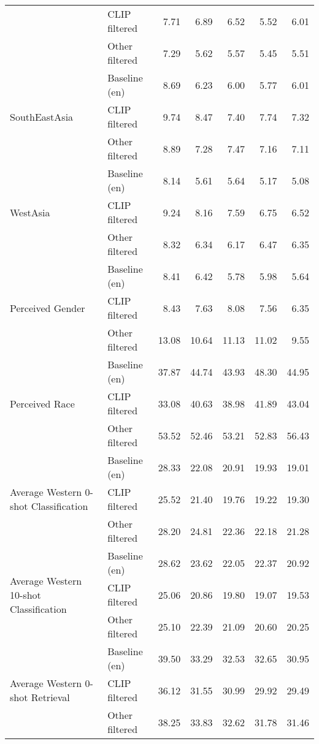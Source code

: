{\begin{longtable}{l|l|rrrrr}
 & CLIP filtered & 7.71 & 6.89 & 6.52 & 5.52 & 6.01 \\
 & Other filtered & 7.29 & 5.62 & 5.57 & 5.45 & 5.51 \\
\midrule
\multirow[t]{3}{*}{SouthEastAsia} & Baseline (en) & 8.69 & 6.23 & 6.00 & 5.77 & 6.01 \\
 & CLIP filtered & 9.74 & 8.47 & 7.40 & 7.74 & 7.32 \\
 & Other filtered & 8.89 & 7.28 & 7.47 & 7.16 & 7.11 \\
\midrule
\multirow[t]{3}{*}{WestAsia} & Baseline (en) & 8.14 & 5.61 & 5.64 & 5.17 & 5.08 \\
 & CLIP filtered & 9.24 & 8.16 & 7.59 & 6.75 & 6.52 \\
 & Other filtered & 8.32 & 6.34 & 6.17 & 6.47 & 6.35 \\
\midrule
\multirow[t]{3}{*}{Perceived Gender} & Baseline (en) & 8.41 & 6.42 & 5.78 & 5.98 & 5.64 \\
 & CLIP filtered & 8.43 & 7.63 & 8.08 & 7.56 & 6.35 \\
 & Other filtered & 13.08 & 10.64 & 11.13 & 11.02 & 9.55 \\
\midrule
\multirow[t]{3}{*}{Perceived Race} & Baseline (en) & 37.87 & 44.74 & 43.93 & 48.30 & 44.95 \\
 & CLIP filtered & 33.08 & 40.63 & 38.98 & 41.89 & 43.04 \\
 & Other filtered & 53.52 & 52.46 & 53.21 & 52.83 & 56.43 \\
\midrule
\multirow[t]{3}{*}{Average Western 0-shot Classification} & Baseline (en) & 28.33 & 22.08 & 20.91 & 19.93 & 19.01 \\
 & CLIP filtered & 25.52 & 21.40 & 19.76 & 19.22 & 19.30 \\
 & Other filtered & 28.20 & 24.81 & 22.36 & 22.18 & 21.28 \\
\midrule
\multirow[t]{3}{*}{Average Western 10-shot Classification} & Baseline (en) & 28.62 & 23.62 & 22.05 & 22.37 & 20.92 \\
 & CLIP filtered & 25.06 & 20.86 & 19.80 & 19.07 & 19.53 \\
 & Other filtered & 25.10 & 22.39 & 21.09 & 20.60 & 20.25 \\
\midrule
\multirow[t]{3}{*}{Average Western 0-shot Retrieval} & Baseline (en) & 39.50 & 33.29 & 32.53 & 32.65 & 30.95 \\
 & CLIP filtered & 36.12 & 31.55 & 30.99 & 29.92 & 29.49 \\
 & Other filtered & 38.25 & 33.83 & 32.62 & 31.78 & 31.46 \\

\end{longtable}}
